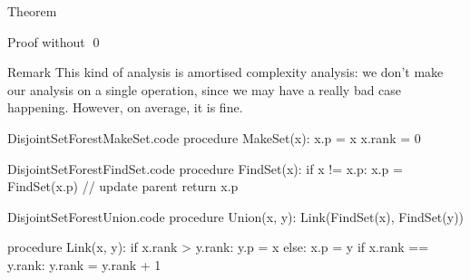 \documentclass[a4paper]{article}
\begin{document}
\begin{parag}{Theorem}
\begin{subparag}{Proof without}
        \qed
    \end{subparag}

    \begin{subparag}{Remark}
        This kind of analysis is amortised complexity analysis: we don't make our analysis on a single operation, since we may have a really bad case happening. However, on average, it is fine.
    \end{subparag}
    
\end{parag}

\begin{filecontents*}[overwrite]{DisjointSetForestMakeSet.code}
procedure MakeSet(x):
    x.p = x
    x.rank = 0
\end{filecontents*}

\begin{filecontents*}[overwrite]{DisjointSetForestFindSet.code}
procedure FindSet(x):
    if x != x.p:
        x.p = FindSet(x.p)  // update parent
    return x.p
\end{filecontents*}

\begin{filecontents*}[overwrite]{DisjointSetForestUnion.code}
procedure Union(x, y):
    Link(FindSet(x), FindSet(y))

procedure Link(x, y):
    if x.rank > y.rank:
        y.p = x
    else:
        x.p = y
        if x.rank == y.rank:
            y.rank = y.rank + 1
\end{filecontents*}
\end{document}
